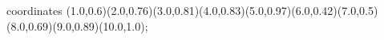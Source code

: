 					coordinates { (1.0,0.6)(2.0,0.76)(3.0,0.81)(4.0,0.83)(5.0,0.97)(6.0,0.42)(7.0,0.5)(8.0,0.69)(9.0,0.89)(10.0,1.0)};